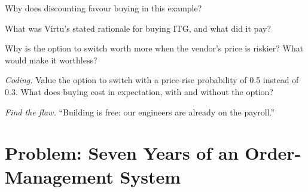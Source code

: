 \begin{exercise}[$\star\star$]\label{exo:fm:build-against-buy:4}
Why does discounting favour buying in this example?
\end{exercise}

\begin{exercise}[$\star\star$]\label{exo:fm:build-against-buy:5}
What was Virtu's stated rationale for buying ITG, and what did it pay?
\end{exercise}

\begin{exercise}[$\star\star$]\label{exo:fm:build-against-buy:6}
Why is the option to switch worth more when the vendor's price is riskier? What would make it worthless?
\end{exercise}

\begin{exercise}[$\star\star\star$]\label{exo:fm:build-against-buy:7}
\emph{Coding.} Value the option to switch with a price-rise probability of 0.5 instead of 0.3. What does buying cost in expectation, with and
without the option?
\end{exercise}

\begin{exercise}[$\star\star\star$]\label{exo:fm:build-against-buy:8}
\emph{Find the flaw.} ``Building is free: our engineers are already on the payroll.''
\end{exercise}

\section{Problem: Seven Years of an Order-Management System}

